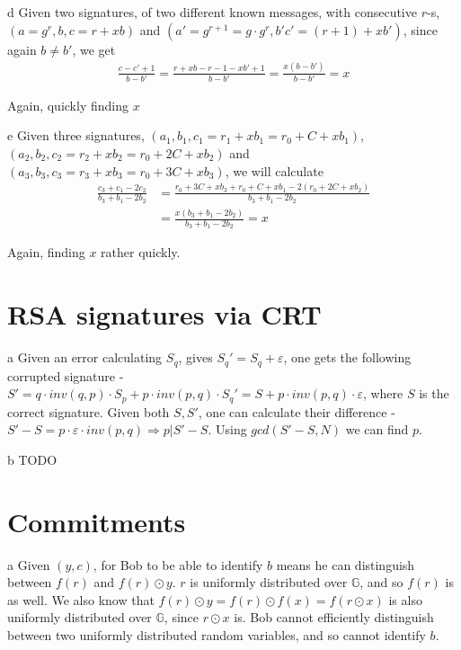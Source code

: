\documentclass{article}
\begin{document}
\begin{paragraph}
    d Given two signatures, of two different known messages, with consecutive \(r\)-s, \((a = g^r, b, c = r + xb)\) and \((a' = g^{r + 1} = g \cdot g^r, b' c' = (r + 1) + xb')\), since again \(b \neq b'\), we get
    \begin{align*}
        \frac{c - c' + 1}{b - b'} = \frac{r + xb - r - 1 - xb' + 1}{b - b'} = \frac{x(b - b')}{b - b'} = x
    \end{align*}
    
    Again, quickly finding \(x\)
\end{paragraph}
\newpage

\begin{paragraph}
    e Given three signatures, \((a_1, b_1, c_1 = r_1 + xb_1 = r_0 + C + xb_1)\), \((a_2, b_2, c_2 = r_2 + xb_2 = r_0 + 2C + xb_2)\) and \((a_3, b_3, c_3 = r_3 + xb_3 = r_0 + 3C + xb_3)\), we will calculate
    \begin{align*}
        \frac{c_3 + c_1 - 2c_2}{b_3 + b_1 - 2b_2} &= \frac{r_0 + 3C + xb_3 + r_0 + C + xb_1 - 2(r_0 + 2C + xb_2)}{b_3 + b_1 - 2b_2}\\
        &= \frac{x(b_3 + b_1 - 2b_2)}{b_3 + b_1 - 2b_2} = x
    \end{align*}
    
    Again, finding \(x\) rather quickly.
\end{paragraph}

\section{RSA signatures via CRT}
\begin{paragraph}
    a Given an error calculating $S_q$, gives $S_q' = S_q + \varepsilon$, one gets the following
    corrupted signature - $S' = q\cdot inv(q, p)\cdot S_p + p\cdot inv(p,q)\cdot S_q' =
    S + p\cdot inv(p,q)\cdot \varepsilon$, where $S$ is the correct signature. Given both $S, S'$,
    one can calculate their difference - $S' - S = p\cdot \varepsilon\cdot inv(p,q) \Rightarrow p|S'-S$.
    Using $gcd(S' - S, N)$ we can find $p$.
\end{paragraph}

\begin{paragraph}
    b TODO
\end{paragraph}

\section{Commitments}
\begin{paragraph}
    a Given \((y, c)\), for Bob to be able to identify \(b\) means he can distinguish between \(f(r)\) and \(f(r) \odot y\). \(r\) is uniformly distributed over \(\mathbb{G}\), and so \(f(r)\) is as well. We also know that \(f(r) \odot y = f(r) \odot f(x) = f(r \odot x)\) is also uniformly distributed over \(\mathbb{G}\), since \(r \odot x\) is. Bob cannot efficiently distinguish between two uniformly distributed random variables, and so cannot identify \(b\).
\end{paragraph}
\end{document}
